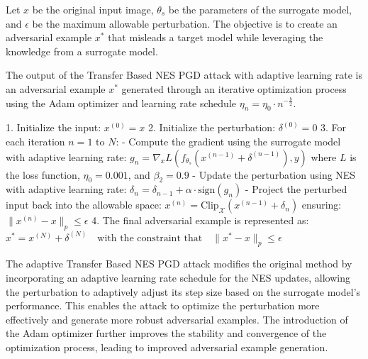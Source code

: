 Let $x$ be the original input image, $\theta_s$ be the parameters of the surrogate model, and $\epsilon$ be the maximum allowable perturbation. The objective is to create an adversarial example $x^*$ that misleads a target model while leveraging the knowledge from a surrogate model.

The output of the Transfer Based NES PGD attack with adaptive learning rate is an adversarial example $x^*$ generated through an iterative optimization process using the Adam optimizer and learning rate schedule $\eta_n = \eta_0 \cdot n^{-\frac{b}{2}}$.

1. Initialize the input:
   $x^{(0)} = x$
2. Initialize the perturbation:
   $\delta^{(0)} = 0$
3. For each iteration $n = 1$ to $N$:
   - Compute the gradient using the surrogate model with adaptive learning rate:
   $g_n = \nabla_x L(f_{\theta_s}(x^{(n-1)} + \delta^{(n-1)}), y)$
   where $L$ is the loss function, $\eta_0 = 0.001$, and $\beta_2 = 0.9$
   - Update the perturbation using NES with adaptive learning rate:
   $\delta_n = \delta_{n-1} + \alpha \cdot \text{sign}(g_n)$
   - Project the perturbed input back into the allowable space:
   $x^{(n)} = \text{Clip}_{\mathcal{X}}(x^{(n-1)} + \delta_n)$
   ensuring:
   $\|x^{(n)} - x\|_p \leq \epsilon$
4. The final adversarial example is represented as:
   $x^* = x^{(N)} + \delta^{(N)} \quad \text{with the constraint that} \quad \|x^* - x\|_p \leq \epsilon$

The adaptive Transfer Based NES PGD attack modifies the original method by incorporating an adaptive learning rate schedule for the NES updates, allowing the perturbation to adaptively adjust its step size based on the surrogate model's performance. This enables the attack to optimize the perturbation more effectively and generate more robust adversarial examples. The introduction of the Adam optimizer further improves the stability and convergence of the optimization process, leading to improved adversarial example generation.